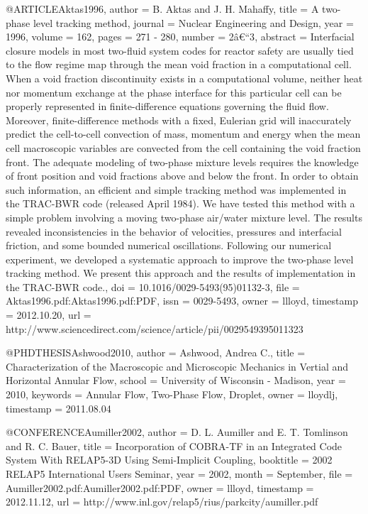 
@ARTICLE{Aktas1996,
  author = {B. Aktas and J. H. Mahaffy},
  title = {A two-phase level tracking method},
  journal = {Nuclear Engineering and Design},
  year = {1996},
  volume = {162},
  pages = {271 - 280},
  number = {2â€“3},
  abstract = {Interfacial closure models in most two-fluid system codes for reactor
	safety are usually tied to the flow regime map through the mean void
	fraction in a computational cell. When a void fraction discontinuity
	exists in a computational volume, neither heat nor momentum exchange
	at the phase interface for this particular cell can be properly represented
	in finite-difference equations governing the fluid flow. Moreover,
	finite-difference methods with a fixed, Eulerian grid will inaccurately
	predict the cell-to-cell convection of mass, momentum and energy
	when the mean cell macroscopic variables are convected from the cell
	containing the void fraction front. The adequate modeling of two-phase
	mixture levels requires the knowledge of front position and void
	fractions above and below the front. In order to obtain such information,
	an efficient and simple tracking method was implemented in the TRAC-BWR
	code (released April 1984). We have tested this method with a simple
	problem involving a moving two-phase air/water mixture level. The
	results revealed inconsistencies in the behavior of velocities, pressures
	and interfacial friction, and some bounded numerical oscillations.
	Following our numerical experiment, we developed a systematic approach
	to improve the two-phase level tracking method. We present this approach
	and the results of implementation in the TRAC-BWR code.},
  doi = {10.1016/0029-5493(95)01132-3},
  file = {Aktas1996.pdf:Aktas1996.pdf:PDF},
  issn = {0029-5493},
  owner = {llloyd},
  timestamp = {2012.10.20},
  url = {http://www.sciencedirect.com/science/article/pii/0029549395011323}
}

@PHDTHESIS{Ashwood2010,
  author = {Ashwood, Andrea C.},
  title = {Characterization of the Macroscopic and Microscopic Mechanics in
	Vertial and Horizontal Annular Flow},
  school = {University of Wisconsin - Madison},
  year = {2010},
  keywords = {Annular Flow, Two-Phase Flow, Droplet},
  owner = {lloydlj},
  timestamp = {2011.08.04}
}

@CONFERENCE{Aumiller2002,
  author = {D. L. Aumiller and E. T. Tomlinson and R. C. Bauer},
  title = {Incorporation of {COBRA-TF} in an Integrated Code System With {RELAP5-3D}
	Using Semi-Implicit Coupling},
  booktitle = {2002 RELAP5 International Users Seminar},
  year = {2002},
  month = {September},
  file = {Aumiller2002.pdf:Aumiller2002.pdf:PDF},
  owner = {llloyd},
  timestamp = {2012.11.12},
  url = {http://www.inl.gov/relap5/rius/parkcity/aumiller.pdf}
}

